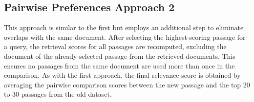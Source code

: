 \subsection{Pairwise Preferences Approach 2}\label{pairwise-preferences-approach-2}

This approach is similar to the first but employs an additional step to eliminate overlaps with the same document. After selecting the highest-scoring passage for a query, the retrieval scores for all passages are recomputed, excluding the document of the already-selected passage from the retrieved documents. This ensures no passages from the same document are used more than once in the comparison. As with the first approach, the final relevance score is obtained by averaging the pairwise comparison scores between the new passage and the top 20 to 30 passages from the old dataset.
